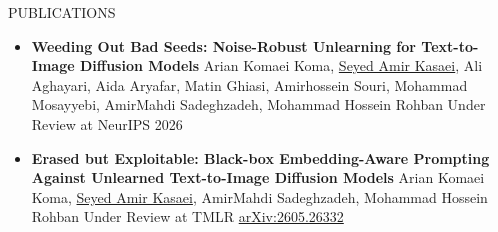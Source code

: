 \documentclass[]{CV}
\begin{document}
\begin{section}{PUBLICATIONS}
\begin{itemize}
    \item \textbf{Weeding Out Bad Seeds: Noise-Robust Unlearning for Text-to-Image Diffusion Models} \newline
    Arian Komaei Koma, \underline{Seyed Amir Kasaei}, Ali Aghayari, Aida Aryafar, Matin Ghiasi, Amirhossein Souri, Mohammad Mosayyebi, AmirMahdi Sadeghzadeh, Mohammad Hossein Rohban \newline
    Under Review at NeurIPS 2026

    \item \textbf{Erased but Exploitable: Black-box Embedding-Aware Prompting Against Unlearned Text-to-Image Diffusion Models} \newline
    Arian Komaei Koma, \underline{Seyed Amir Kasaei}, AmirMahdi Sadeghzadeh, Mohammad Hossein Rohban \newline
    Under Review at TMLR \newline
    \href{https://arxiv.org/abs/2605.26332}{arXiv:2605.26332}
\end{itemize}
\end{section}
\end{document}

